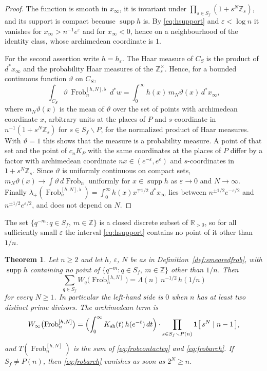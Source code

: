 \documentclass[11pt]{amsart}
\newtheorem{theorem}{Theorem}[section]
\theoremstyle{definition}
\newcommand{\R}{\mathbb R}
\newcommand{\Z}{\mathbb Z}
\newcommand{\Frob}{\operatorname{Frob}}
\newcommand{\supp}{\operatorname{supp}}
\newcommand{\Ksh}{K_{\mathrm{sh}}}
\begin{document}
\begin{proof}
The function is smooth in $x_\infty$, it is invariant under
$\prod_{s\in S_f}(1+s^N\Z_s)$, and its support is compact because $\supp h$
is. By \eqref{eq:hsupport} and $\varepsilon<\log n$ it vanishes for
$x_\infty>n^{-1}e^{\varepsilon}$ and for $x_\infty<0$, hence on a
neighbourhood of the identity class, whose archimedean coordinate is $1$.

For the second assertion write $h=h_\varepsilon$. The Haar measure of $C_S$
is the product of $d^*x_\infty$ and the probability Haar measures of the
$\Z_s^\times$. Hence, for a bounded continuous function
$\vartheta$ on $C_S$,
\[
  \int_{C_S}\vartheta\,\Frob_n^{[h,N],\flat}\,d^*w
   =\int_0^\infty h(x)\,m_N\vartheta(x)\,d^*x_\infty ,
\]
where $m_N\vartheta(x)$ is the mean of $\vartheta$ over the set of points with
archimedean coordinate $x$, arbitrary units at the places of $P$ and
$s$-coordinate in $n^{-1}(1+s^N\Z_s)$ for $s\in S_f\smallsetminus P$, for
the normalized product of Haar measures. With $\vartheta=1$ this shows that the
measure is a probability measure. A point of that set and the point of
$c_nK_P$ with the same coordinates at the places of $P$ differ by a factor
with archimedean coordinate $nx\in(e^{-\varepsilon},e^{\varepsilon})$ and
$s$-coordinates in $1+s^N\Z_s$. Since $\vartheta$ is uniformly continuous on
compact sets, $m_N\vartheta(x)\to\int\vartheta\,d\Frob_n$ uniformly for
$x\in\supp h$ as $\varepsilon\to0$ and $N\to\infty$. Finally
$\lambda_\mp(\Frob_n^{[h,N],\flat})=\int_0^\infty h(x)x^{\mp1/2}\,d^*x_\infty$
lies between $n^{\pm1/2}e^{-\varepsilon/2}$ and $n^{\pm1/2}e^{\varepsilon/2}$, and
does not depend on $N$.
\end{proof}

The set $\{q^{-m}:q\in S_f,\ m\in\Z\}$ is a closed discrete subset of
$\R_{>0}$, so for all sufficiently small $\varepsilon$ the interval
\eqref{eq:hsupport} contains no point of it other than $1/n$.

\begin{theorem}\label{thm:frobcontact}
Let $n\ge2$ and let $h$, $\varepsilon$, $N$ be as in
Definition~\ref{def:smearedfrob}, with $\supp h$ containing no point of
$\{q^{-m}:q\in S_f,\ m\in\Z\}$ other than $1/n$. Then
\begin{equation}\label{eq:frobcontacteq}
  \sum_{q\in S_f}W_q\bigl(\Frob_n^{[h,N]}\bigr)
   =\Lambda(n)\,n^{-1/2}\,h(1/n)
\end{equation}
for every $N\ge1$. In particular the left-hand side is $0$ when $n$ has at
least two distinct prime divisors. The archimedean term is
\begin{equation}\label{eq:frobarch}
  W_\infty\bigl(\Frob_n^{[h,N]}\bigr)
   =\Bigl(\int_0^\infty \Ksh(t)\,h(e^{-t})\,dt\Bigr)\cdot
     \prod_{s\in S_f\smallsetminus P(n)}\mathbf 1\bigl[\,s^N\mid n-1\,\bigr],
\end{equation}
and $T(\Frob_n^{[h,N]})$ is the sum of \eqref{eq:frobcontacteq} and
\eqref{eq:frobarch}. If $S_f\ne P(n)$, then \eqref{eq:frobarch} vanishes as
soon as $2^N\ge n$.
\end{theorem}
\end{document}
